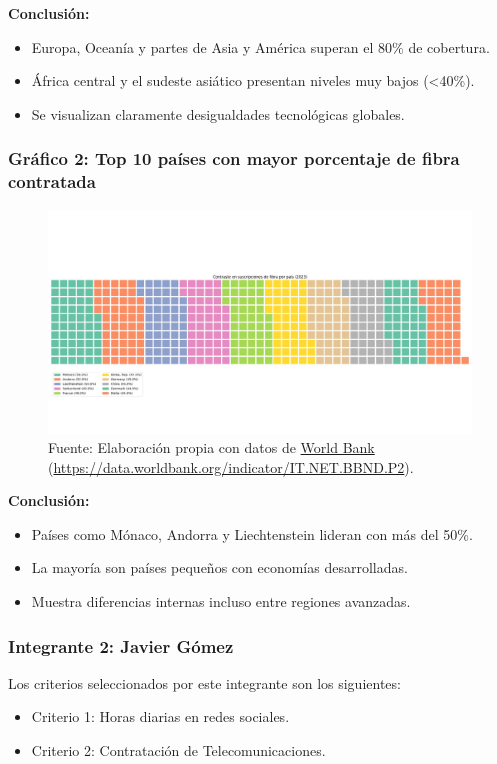\documentclass[12pt, a4paper]{article}
\begin{document}
\textbf{Conclusión:}
\begin{itemize}
    \item Europa, Oceanía y partes de Asia y América superan el 80\% de cobertura.
    \item África central y el sudeste asiático presentan niveles muy bajos (<40\%).
    \item Se visualizan claramente desigualdades tecnológicas globales.
\end{itemize}

\subsubsection*{Gráfico 2: Top 10 países con mayor porcentaje de fibra contratada}
\begin{figure}[H]
    \centering
    \includegraphics[width=1\textwidth]{images/Grafico_fibra_contratada_FC2.png}
    \caption[2]{Fuente: Elaboración propia con datos de \href{https://data.worldbank.org}{World Bank} 
    (\url{https://data.worldbank.org/indicator/IT.NET.BBND.P2}).}
\end{figure}

\textbf{Conclusión:}
\begin{itemize}
    \item Países como Mónaco, Andorra y Liechtenstein lideran con más del 50\%.
    \item La mayoría son países pequeños con economías desarrolladas.
    \item Muestra diferencias internas incluso entre regiones avanzadas.
\end{itemize}

\subsubsection*{Integrante 2: Javier Gómez}
Los criterios seleccionados por este integrante son los siguientes:
\begin{itemize}
    \item Criterio 1: Horas diarias en redes sociales.
    \item Criterio 2: Contratación de Telecomunicaciones.
\end{itemize}
\end{document}
